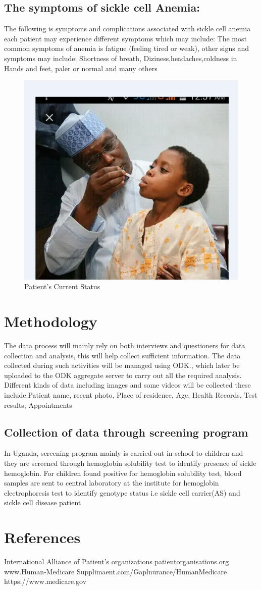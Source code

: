 \documentclass[12pt,]{article}
\begin{document}
\subsection{The symptoms of sickle cell Anemia:}
The following is symptoms and complications associated with sickle cell anemia each patient may experience different symptoms which may include: The most common symptoms of anemia is fatigue (feeling tired or weak), other signs and symptoms may include; Shortness of breath, Diziness,headaches,coldness in Hands and feet, paler or normal and many others
\begin{figure}
\includegraphics[width=\linewidth]{sickle 1.png}
\caption{Patient's Current Status}
\end{figure}
\newpage
\section{Methodology}
The data process will mainly rely on both interviews and questioners for data collection and analysis, this will help collect sufficient information. The data collected during such activities will be managed using ODK., which later be uploaded to the ODK aggregate server to carry out all the required analysis. Different kinds of data including images and some videos will be collected these include:Patient name, recent photo, Place of residence, Age, Health Records, Test results, Appointments
\subsection{Collection of data through screening program}
In Uganda, screening program mainly is carried out in school to children and they are screened through hemoglobin solubility test to identify presence of sickle hemoglobin. For children found positive for hemoglobin solubility test, blood samples are sent to central laboratory at the institute for hemoglobin electrophoresis test to identify genotype status i.e sickle cell carrier(AS) and sickle cell disease patient 

\section{References}
International Alliance of Patient’s organizations patientorganisations.org
www.Human-Medicare Supplimaent.com/Gaplnurance/HumanMedicare
https://www.medicare.gov
\end{document}
